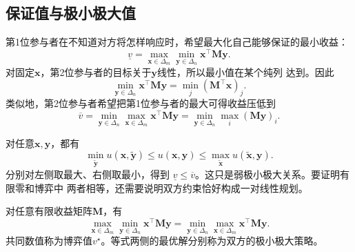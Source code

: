 \subsection{保证值与极小极大值}

第1位参与者在不知道对方将怎样响应时，希望最大化自己能够保证的最小收益：
\[
  \underline v
  =
  \max_{\bm{x}\in\Delta_m}
  \min_{\bm{y}\in\Delta_n}
  \bm{x}^{\top}\bm{M}\bm{y}.
\]
对固定\(\bm{x}\)，第2位参与者的目标关于\(\bm{y}\)线性，所以最小值在某个纯列
达到。因此
\[
  \min_{\bm{y}\in\Delta_n}
  \bm{x}^{\top}\bm{M}\bm{y}
  =
  \min_j(\bm{M}^{\top}\bm{x})_j.
\]
类似地，第2位参与者希望把第1位参与者的最大可得收益压低到
\[
  \overline v
  =
  \min_{\bm{y}\in\Delta_n}
  \max_{\bm{x}\in\Delta_m}
  \bm{x}^{\top}\bm{M}\bm{y}
  =
  \min_{\bm{y}\in\Delta_n}\max_i(\bm{M}\bm{y})_i.
\]

对任意\(\bm{x},\bm{y}\)，都有
\[
  \min_{\widetilde{\bm{y}}}
  u(\bm{x},\widetilde{\bm{y}})
  \leq
  u(\bm{x},\bm{y})
  \leq
  \max_{\widetilde{\bm{x}}}
  u(\widetilde{\bm{x}},\bm{y}).
\]
分别对左侧取最大、右侧取最小，得到
\(\underline v\leq\overline v\)。这只是弱极小极大关系。要证明有限零和博弈中
两者相等，还需要说明双方约束恰好构成一对线性规划。

\begin{theorem}[有限零和博弈的极小极大定理]
\label{thm:game-finite-minimax}
对任意有限收益矩阵\(\bm{M}\)，有
\begin{equation}
  \max_{\bm{x}\in\Delta_m}
  \min_{\bm{y}\in\Delta_n}
  \bm{x}^{\top}\bm{M}\bm{y}
  =
  \min_{\bm{y}\in\Delta_n}
  \max_{\bm{x}\in\Delta_m}
  \bm{x}^{\top}\bm{M}\bm{y}.
  \label{eq:game-minimax-equality}
\end{equation}
共同数值称为博弈值\(v^\star\)。等式两侧的最优解分别称为双方的极小极大策略。
\end{theorem}

